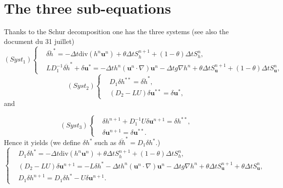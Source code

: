 \documentclass[a4paper, 11pt]{article}
\begin{document}
\section{The three sub-equations}
Thanks to the Schur decomposition one has the three systems (see also the document du 31 juillet)
\begin{equation*}
(Syst_1)\left\{\begin{split}
&\overline{\delta h}^*=-\Delta t\text{div}(h^n\boldsymbol{u}^n)+\theta\Delta tS_h^{n+1}+(1-\theta)\Delta tS_h^{n},\\
&LD_1^{-1}\overline{\delta h}^*+\delta \boldsymbol{u}^*=-\Delta th^n\left(\boldsymbol{u}^n\cdot\nabla\right)\boldsymbol{u}^n-\Delta tg\nabla h^n+\theta\Delta tS_{\boldsymbol{u}}^{n+1}+(1-\theta)\Delta tS_{\boldsymbol{u}}^n,
\end{split}\right.
\end{equation*}
\begin{equation*}
(Syst_2)\left\{\begin{split}
&D_1\delta h^{**}=\overline{\delta h}^*,\\
&(D_2-LU)\delta \boldsymbol{u}^{**}=\delta \boldsymbol{u}^{*},
\end{split}
\right.
\end{equation*}
and

\begin{equation*}
(Syst_3)\left\{\begin{split}
&\delta h^{n+1}+D_1^{-1}U\delta \boldsymbol{u}^{n+1}=\delta h^{**},\\
&\delta \boldsymbol{u}^{n+1}=\delta \boldsymbol{u}^{**}.
\end{split}\right.
\end{equation*}
Hence it yields (we define $\delta h^*$ such as $\overline{\delta h}^*=D_1\delta h^*$.)
\begin{equation*}
\left\{
\begin{split}
&D_1\delta h^{*}=-\Delta t\text{div}(h^n\boldsymbol{u}^n)+\theta \Delta tS_h^{n+1}+(1-\theta)\Delta t S_{h}^n,\\
&(D_2-LU)\delta \boldsymbol{u}^{n+1}=-L\delta h^*-\Delta th^n(\boldsymbol{u}^n\cdot\nabla)\boldsymbol{u}^n-\Delta tg\nabla h^n+\theta\Delta tS_{\boldsymbol{u}}^{n+1}+\theta\Delta tS_{\boldsymbol{u}}^n,\\
&D_1\delta h^{n+1}=D_1\delta h^*-U\delta \boldsymbol{u}^{n+1}.
\end{split}\right.
\end{equation*}
\end{document}
